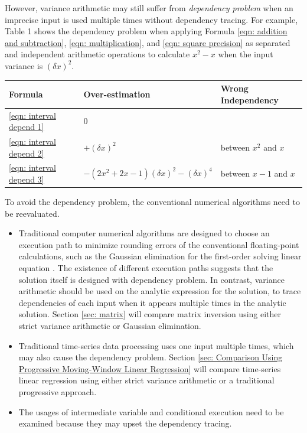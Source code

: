 \documentclass[twoside]{article}
\numberwithin{equation}{section}
\begin{document}
However, variance arithmetic may still suffer from \emph{dependency problem} when an imprecise input is used multiple times without dependency tracing.
For example, Table 1 shows the dependency problem when applying Formula \eqref{eqn: addition and subtraction}, \eqref{eqn: multiplication}, and \eqref{eqn: square precision} as separated and independent arithmetic operations to calculate $x^2 - x$ when the input variance is $(\delta x)^2$.
\begin{table}
\label{eqn: dependency example}
\centering
\begin{tabular}{|l|l|l|} 
\hline 
Formula & Over-estimation & Wrong Independency \\ 
\hline 
\eqref{eqn: interval depend 1} & $0$ & \\
\hline 
\eqref{eqn: interval depend 2} & $+(\delta x)^2$ & between $x^2$ and $x$ \\
\hline 
\eqref{eqn: interval depend 3} & $-(2 x^2 + 2x - 1)(\delta x)^2 - (\delta x)^4$ & between $x-1$ and $x$ \\
\hline 
\end{tabular}
\end{table}

To avoid the dependency problem, the conventional numerical algorithms need to be reevaluated.
\begin{itemize}
\item   
Traditional computer numerical algorithms are designed to choose an execution path to minimize rounding errors of the conventional floating-point calculations, such as the Gaussian elimination for the first-order solving linear equation \cite{Numerical_Recipes}.
The existence of different execution paths suggests that the solution itself is designed with dependency problem.
In contrast, variance arithmetic should be used on the analytic expression for the solution, to trace dependencies of each input when it appears multiple times in the analytic solution.
Section \ref{sec: matrix} will compare matrix inversion using either strict variance arithmetic or Gaussian elimination.

\item  
Traditional time-series data processing uses one input multiple times, which may also cause the dependency problem.
Section \ref{sec: Comparison Using Progressive Moving-Window Linear Regression} will compare time-series linear regression using either strict variance arithmetic or a traditional progressive approach.

\item
The usages of intermediate variable and conditional execution need to be examined because they may upset the dependency tracing. 

\end{itemize}
\end{document}
